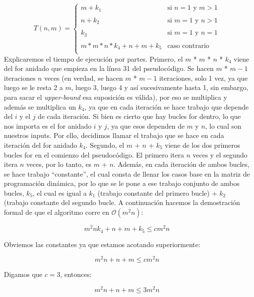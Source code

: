 \documentclass[12pt,a4,paper]{article}
\begin{document}
\begin{equation*}
    T(n, m) =
    \begin{cases}
        m + k_1 & \text{si } n = 1 \text{ y } m > 1\\\\
        n + k_2 & \text{si } m = 1 \text{ y } n > 1\\\\
        k_3 & \text{si } m = 1 \text{ y } n = 1\\\\
        m * m * n * k_4 + n + m + k_5 & \text{caso contrario}\\
    \end{cases}
\end{equation*}
\newline
Explicaremos el tiempo de ejecución por partes. Primero, el $m$ * $m$ * $n$ * $k_4$ viene del for anidado que empieza en la línea 31 del pseudocódigo. Se hacen $m$ * $m-1$ iteraciones $n$ veces (en verdad, se hacen $m$ * $m-1$ iteraciones, solo 1 vez, ya que luego se le resta 2 a $m$, luego 3, luego 4 y así sucesivamente hasta 1, sin embargo, para sacar el \textit{upper-bound} esa suposición es válida), por eso se multiplica y además se multiplica un $k_4$, ya que en cada iteración se hace trabajo que depende del $i$ y el $j$ de cada iteración. Si bien es cierto que hay bucles for dentro, lo que nos importa es el for anidado $i$ y $j$, ya que esos dependen de $m$ y $n$, lo cual son nuestros inputs. Por ello, decidimos llamar el trabajo que se hace en cada iteración del for anidado $k_4$. Segundo, el $m$ + $n$ + $k_5$ viene de los dos primeros bucles for en el comienzo del pseudocódigo. El primero itera $n$ veces y el segundo itera $n$ veces, por lo tanto, es $m$ + $n$. Además, en cada iteración de ambos bucles, se hace trabajo ``constante'', el cual consta de llenar los casos base en la matriz de programación dinámica, por lo que se le pone a ese trabajo conjunto de ambos bucles, $k_5$, el cual es igual a $k_1$ (trabajo constante del primero bucle) + $k_2$ (trabajo constante del segundo bucle. A continuación hacemos la demostración formal de que el algoritmo corre en $\mathcal{O}(m^{2}n)$:

$$m^{2}nk_4 + n + m + k_5 \leq cm^{2}n$$

Obviemos las constantes ya que estamos acotando superiormente:

$$m^{2}n + n + m \leq cm^{2}n$$

Digamos que $c = 3$, entonces:

$$m^{2}n + n + m \leq 3m^{2}n$$
\end{document}
